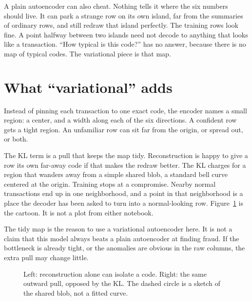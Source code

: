 \documentclass[11pt]{article}
\begin{document}
A plain autoencoder can also cheat. Nothing tells it where the six
numbers should live. It can park a strange row on its own island, far
from the summaries of ordinary rows, and still redraw that island
perfectly. The training rows look fine. A point halfway between two
islands need not decode to anything that looks like a transaction.
``How typical is this code?'' has no answer, because there is no map of
typical codes. The variational piece is that map.

\section{What ``variational'' adds}

Instead of pinning each transaction to one exact code, the encoder names
a small region: a center, and a width along each of the six directions.
A confident row gets a tight region. An unfamiliar row can sit far from
the origin, or spread out, or both.

The KL term is a pull that keeps the map tidy. Reconstruction is happy
to give a row its own far-away code if that makes the redraw better.
The KL charges for a region that wanders away from a simple shared blob,
a standard bell curve centered at the origin. Training stops at a
compromise. Nearby normal transactions end up in one neighborhood, and a
point in that neighborhood is a place the decoder has been asked to turn
into a normal-looking row. Figure~\ref{fig:forces} is the cartoon.
It is not a plot from either notebook.

The tidy map is the reason to use a variational autoencoder here.
It is not a claim that this model always beats a plain autoencoder at
finding fraud. If the bottleneck is already tight, or the anomalies are
obvious in the raw columns, the extra pull may change little.

\begin{figure}[ht]
\centering
{}
\caption{Left: reconstruction alone can isolate a code.
Right: the same outward pull, opposed by the KL.
The dashed circle is a sketch of the shared blob, not a fitted curve.}
\label{fig:forces}
\end{figure}
\end{document}
